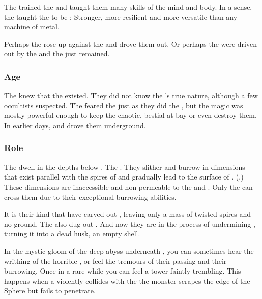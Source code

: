 The \voyagers trained the \noggyaleth and taught them many skills of the mind and body. 
In a sense, the \voyagers taught the \noggyaleth to be :
Stronger, more resilient and more versatile than any machine of metal. 

Perhaps the \noggyaleth rose up against the \voyagers and drove them out.
Or perhaps the \voyagers were driven out by the \xss and the \noggyaleth just remained.





\subsubsection{\Ophidian Age}
The \ophidians knew that the \noggyaleth existed. 
They did not know the \noggyaleth's true nature, although a few occultists suspected.
The \ophidians feared the \noggyaleth just as they did the \xss, but the \ophidian magic was mostly powerful enough to keep the chaotic, bestial \noggyaleth at bay or even destroy them.
In earlier days,  and drove them underground.





\subsubsection{Role}
The \noggyaleth{} dwell in the depths below \Nyx. 
The . 
They slither and burrow in dimensions that exist parallel with the spires of \Nyx{} and gradually lead to the surface of \Erebos. 
(.)
These dimensions are inaccessible and non-permeable to the \resphain{} and \banes. 
Only the \noggyaleth{} can cross them due to their exceptional burrowing abilities. 

It is their kind that have carved out \Erebos, leaving only a mass of twisted spires and no ground. 
The also dug out \Nyx. And now they are in the process of undermining \Miith{}, turning it into a dead husk, an empty shell. 

In the mystic gloom of the deep abyss underneath \Nyx, you can sometimes hear the writhing of the horrible , or feel the tremours of their passing and their burrowing.
Once in a rare while you can feel a tower faintly trembling. 
This happens when a \noggyal{} violently collides with the \CrystalSphere{}\dash the monster scrapes the edge of the Sphere but fails to penetrate. 






